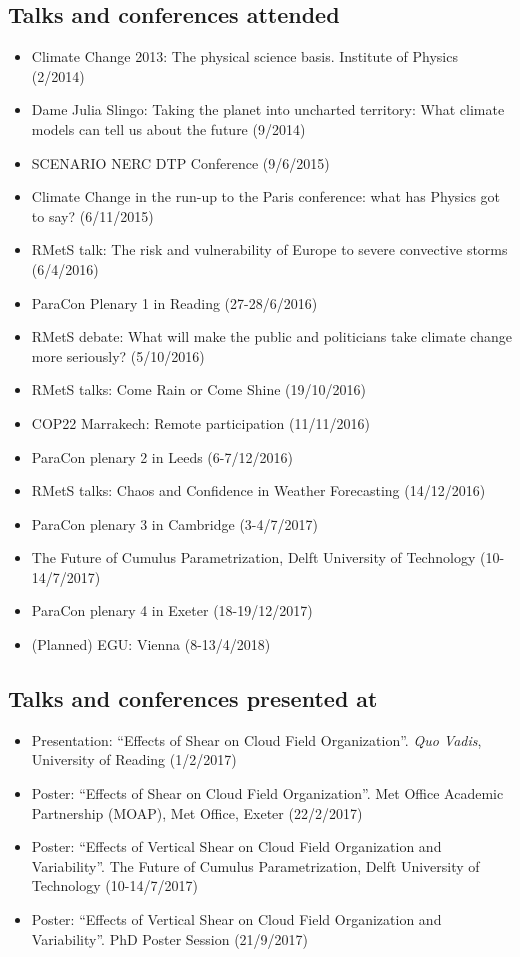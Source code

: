 \documentclass[11pt,a4paper]{article}
\begin{document}
\subsection*{Talks and conferences attended}

\begin{itemize}
  \item Climate Change 2013: The physical science basis. Institute of Physics (2/2014)
  \item Dame Julia Slingo: Taking the planet into uncharted territory: What climate models can tell us about the future (9/2014)
  \item SCENARIO NERC DTP Conference (9/6/2015)
  \item Climate Change in the run-up to the Paris conference: what has Physics got to say? (6/11/2015)
  \item RMetS talk: The risk and vulnerability of Europe to severe convective storms (6/4/2016)
  \item ParaCon Plenary 1 in Reading (27-28/6/2016)
  \item RMetS debate: What will make the public and politicians take climate change more seriously? (5/10/2016)
  \item RMetS talks: Come Rain or Come Shine (19/10/2016)
  \item COP22 Marrakech: Remote participation (11/11/2016)
  \item ParaCon plenary 2 in Leeds (6-7/12/2016)
  \item RMetS talks: Chaos and Confidence in Weather Forecasting (14/12/2016)
  \item ParaCon plenary 3 in Cambridge (3-4/7/2017)
  \item The Future of Cumulus Parametrization, Delft University of Technology (10-14/7/2017)
  \item ParaCon plenary 4 in Exeter (18-19/12/2017)
  \item (Planned) EGU: Vienna (8-13/4/2018)
\end{itemize}

\subsection*{Talks and conferences presented at}

\begin{itemize}
  \item Presentation: ``Effects of Shear on Cloud Field Organization''. \textit{Quo Vadis}, University of Reading (1/2/2017)
  \item Poster: ``Effects of Shear on Cloud Field Organization''. Met Office Academic Partnership (MOAP), Met Office, Exeter (22/2/2017)
  \item Poster: ``Effects of Vertical Shear on Cloud Field Organization and Variability''. The Future of Cumulus Parametrization, Delft University of Technology (10-14/7/2017)
  \item Poster: ``Effects of Vertical Shear on Cloud Field Organization and Variability''. PhD Poster Session (21/9/2017)
\end{itemize}
\end{document}
